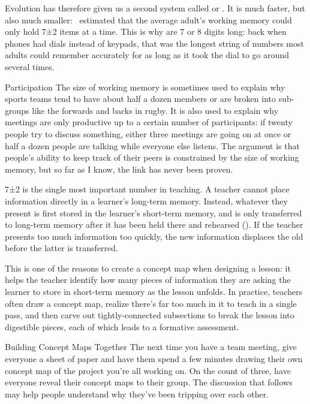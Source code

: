 Evolution has therefore given us a second system
called  or .
It is much faster,
but also much smaller:~\cite{Mill1956} estimated that the average adult's working memory could only hold 7±2 items at a time.
This is why 
are 7 or 8 digits long:
back when phones had dials instead of keypads,
that was the longest string of numbers most adults could remember accurately for as long as it took the dial to go around several times.

\begin{aside}{Participation}
  The size of working memory is sometimes used to explain
  why sports teams tend to have about half a dozen members
  or are broken into sub-groups like the forwards and backs in rugby.
  It is also used to explain why meetings are only productive up to a certain number of participants:
  if twenty people try to discuss something,
  either three meetings are going on at once
  or half a dozen people are talking while everyone else listens.
  The argument is that people's ability to keep track of their peers is constrained by the size of working memory,
  but so far as I know,
  the link has never been proven.
\end{aside}

7±2 is the single most important number in teaching.
A teacher cannot place information directly in a learner's long-term memory.
Instead,
whatever they present is first stored in the learner's short-term memory,
and is only transferred to long-term memory after it has been held there and rehearsed ().
If the teacher presents too much information too quickly,
the new information displaces the old
before the latter is transferred.

This is one of the reasons to create a concept map when designing a lesson:
it helps the teacher identify how many pieces of information
they are asking the learner to store in short-term memory as the lesson unfolds.
In practice,
teachers often draw a concept map,
realize there's far too much in it to teach in a single pass,
and then carve out tightly-connected subsections to break the lesson into digestible pieces,
each of which leads to a formative assessment.

\begin{aside}{Building Concept Maps Together}
  The next time you have a team meeting,
  give everyone a sheet of paper
  and have them spend a few minutes drawing their own concept map of the project you're all working on.
  On the count of three,
  have everyone reveal their concept maps to their group.
  The discussion that follows may help people understand
  why they've been tripping over each other.
\end{aside}

